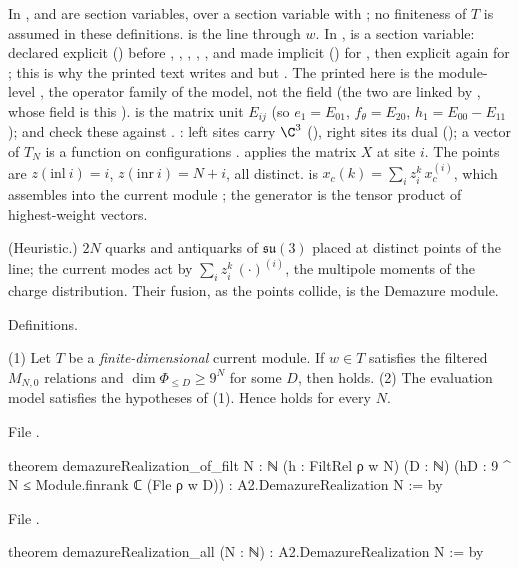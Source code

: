 \begin{dictionary}
In ,  and  are section variables, over a section variable
 with \lean{[AddCommGroup T] [Module ℂ T]}; no finiteness of $T$ is assumed in these definitions.  is
the line through $w$. In ,  is a section variable: declared explicit
() before , , , , , and made implicit ()
for , then explicit again for ; this is why the printed text writes  and  but
. The  printed here is the module-level , the operator family of the model, not the field
 (the two are linked by , whose  field is this ).
 is the matrix unit $E_{ij}$ (so $e_1=E_{01}$, $f_\theta=E_{20}$, $h_1=E_{00}-E_{11}$);
 and  check these against . : left sites
carry $\C^3$ (), right sites its dual (); a vector of $T_N$ is a function on
configurations .  applies the matrix $X$ at site $i$. The points are $z(\mathrm{inl}\ i)=i$,
$z(\mathrm{inr}\ i)=N+i$, all distinct.  is $x_c(k)=\sum_iz_i^k\,x_c^{(i)}$, which assembles into the
current module ; the generator  is the tensor product of highest-weight vectors.
\end{dictionary}

\begin{physics}
(Heuristic.) $2N$ quarks and antiquarks of $\mathfrak{su}(3)$ placed at distinct points of the line; the current modes act by
$\sum_iz_i^k\,(\cdot)^{(i)}$, the multipole moments of the charge distribution. Their fusion, as the points collide, is the
Demazure module.
\end{physics}

\begin{status}
Definitions.
\end{status}

\begin{theorem}[U7 for $A_2$]\label{l26:thm:u7}
(1) Let $T$ be a \emph{finite-dimensional} current module. If $w\in T$ satisfies the filtered $M_{N,0}$ relations and
$\dim\Phi_{\le D}\ge9^N$ for some $D$, then  holds. (2) The evaluation model satisfies the hypotheses of (1). Hence
 holds for every $N$.
\end{theorem}
\noindent File .
\begin{leancode}
theorem demazureRealization_of_filt {N : ℕ} (h : FiltRel ρ w N) (D : ℕ)
    (hD : 9 ^ N ≤ Module.finrank ℂ (Fle ρ w D)) : A2.DemazureRealization N := by
\end{leancode}
\noindent File .
\begin{leancode}
theorem demazureRealization_all (N : ℕ) : A2.DemazureRealization N := by
\end{leancode}

